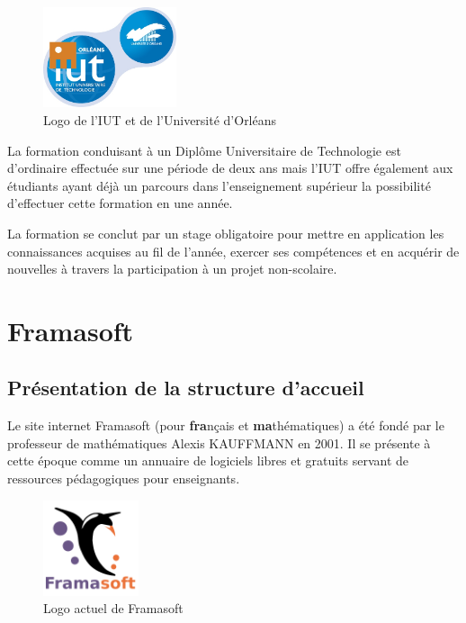 \documentclass[10pt,a4paper, twoside]{report}
\begin{document}
	\begin{figure}[ht]
		\centering
		\includegraphics[width=0.35\textwidth]{images/logo-iut.png}
		\caption{Logo de l'IUT et de l'Université d'Orléans}
		\label{logo-iut}
	\end{figure}
	
	La formation conduisant à un Diplôme Universitaire de Technologie est d'ordinaire effectuée sur une période de deux ans mais l'IUT offre également aux étudiants ayant déjà un parcours dans l'enseignement supérieur la possibilité d'effectuer cette formation en une année.
	
	La formation se conclut par un stage obligatoire pour mettre en application les connaissances acquises au fil de l'année, exercer ses compétences et en acquérir de nouvelles à travers la participation à un projet non-scolaire.
	
	\section{Framasoft}
	\subsection{Présentation de la structure d'accueil}
	
	Le site internet Framasoft (pour \textbf{fra}nçais et \textbf{ma}thématiques) a été fondé par le professeur de mathématiques Alexis KAUFFMANN en 2001. Il se présente à cette époque comme un annuaire de logiciels libres et gratuits servant de ressources pédagogiques pour enseignants.
	
	\begin{figure}[ht]
		\centering
		\includegraphics[width=0.25\textwidth]{images/Framasoft-Logo.png}
		\caption{Logo actuel de Framasoft}
		\label{logo-framasoft}
	\end{figure}
	
\end{document}
